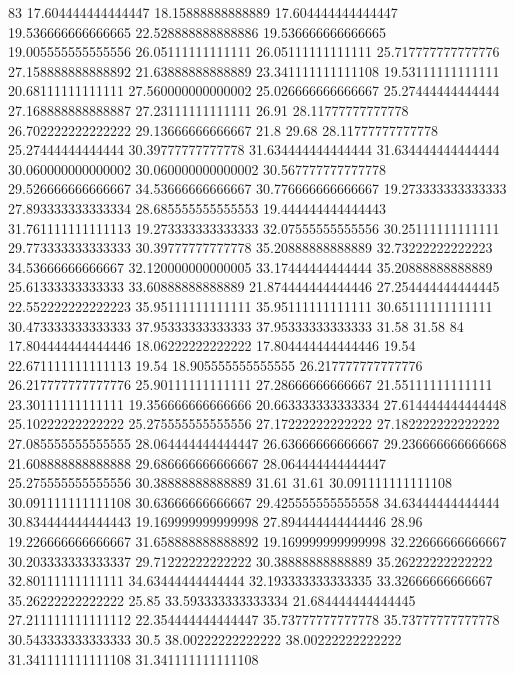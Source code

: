 83 17.604444444444447 18.15888888888889 17.604444444444447 19.536666666666665 22.528888888888886 19.536666666666665 19.005555555555556 26.05111111111111 26.05111111111111 25.717777777777776 27.158888888888892 21.63888888888889 23.341111111111108 19.53111111111111 20.68111111111111 27.560000000000002 25.026666666666667 25.27444444444444 27.168888888888887 27.23111111111111 26.91 28.11777777777778 26.702222222222222 29.13666666666667 21.8 29.68 28.11777777777778 25.27444444444444 30.39777777777778 31.634444444444444 31.634444444444444 30.060000000000002 30.060000000000002 30.567777777777778 29.526666666666667 34.53666666666667 30.776666666666667 19.273333333333333 27.893333333333334 28.685555555555553 19.444444444444443 31.761111111111113 19.273333333333333 32.07555555555556 30.25111111111111 29.773333333333333 30.39777777777778 35.20888888888889 32.73222222222223 34.53666666666667 32.120000000000005 33.17444444444444 35.20888888888889 25.61333333333333 33.60888888888889 21.874444444444446 27.254444444444445 22.552222222222223 35.95111111111111 35.95111111111111 30.65111111111111 30.473333333333333 37.95333333333333 37.95333333333333 31.58 31.58
84 17.804444444444446 18.06222222222222 17.804444444444446 19.54 22.671111111111113 19.54 18.905555555555555 26.217777777777776 26.217777777777776 25.90111111111111 27.28666666666667 21.55111111111111 23.30111111111111 19.356666666666666 20.663333333333334 27.614444444444448 25.10222222222222 25.275555555555556 27.17222222222222 27.182222222222222 27.085555555555555 28.064444444444447 26.63666666666667 29.236666666666668 21.608888888888888 29.686666666666667 28.064444444444447 25.275555555555556 30.38888888888889 31.61 31.61 30.091111111111108 30.091111111111108 30.63666666666667 29.425555555555558 34.63444444444444 30.834444444444443 19.169999999999998 27.894444444444446 28.96 19.226666666666667 31.658888888888892 19.169999999999998 32.22666666666667 30.203333333333337 29.71222222222222 30.38888888888889 35.26222222222222 32.80111111111111 34.63444444444444 32.193333333333335 33.32666666666667 35.26222222222222 25.85 33.593333333333334 21.684444444444445 27.211111111111112 22.354444444444447 35.73777777777778 35.73777777777778 30.543333333333333 30.5 38.00222222222222 38.00222222222222 31.341111111111108 31.341111111111108
